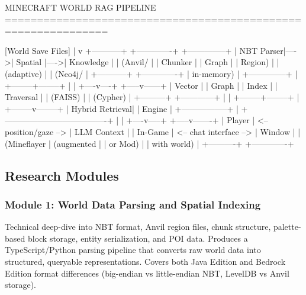 \documentclass[11pt,letterpaper]{article}
\begin{document}
\begin{asciibox}
                    MINECRAFT WORLD RAG PIPELINE
  ==============================================================

  [World Save Files]
       |
       v
  +-----------+     +-------------+     +--------------+
  | NBT Parser|---->| Spatial     |---->| Knowledge    |
  | (Anvil/   |     | Chunker     |     | Graph        |
  |  Region)  |     | (adaptive)  |     | (Neo4j/      |
  +-----------+     +-------------+     |  in-memory)  |
                                        +--------------+
                                             |
                                    +--------+--------+
                                    |                 |
                               +----v----+     +-----v------+
                               | Vector  |     | Graph      |
                               | Index   |     | Traversal  |
                               | (FAISS) |     | (Cypher)   |
                               +---------+     +------------+
                                    |                 |
                                    +--------+--------+
                                             |
                                    +--------v--------+
                                    | Hybrid Retrieval|
                                    | Engine          |
                                    +-----------------+
                                             |
       +-------------------------------------+
       |                                     |
  +----v-----+                         +-----v-------+
  | Player   |  <-- position/gaze -->  | LLM Context |
  | In-Game  |  <-- chat interface -->  | Window      |
  | (Mineflayer                        | (augmented   |
  |  or Mod) |                         |  with world) |
  +----------+                         +-------------+
\end{asciibox}

\subsection{Research Modules}

\subsubsection{Module 1: World Data Parsing and Spatial Indexing}
Technical deep-dive into NBT format, Anvil region files, chunk structure, palette-based block storage, entity serialization, and POI data. Produces a TypeScript/Python parsing pipeline that converts raw world data into structured, queryable representations. Covers both Java Edition and Bedrock Edition format differences (big-endian vs little-endian NBT, LevelDB vs Anvil storage).
\end{document}
